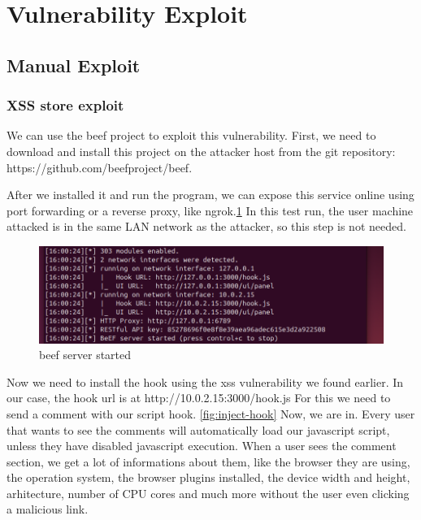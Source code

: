 \documentclass{article}
\begin{document}
\section{Vulnerability Exploit}
\label{}

\subsection{Manual Exploit}
\subsubsection{XSS store exploit}
\label{section:xss-store-exploit}
We can use the beef project to exploit this vulnerability. First, we need to download and install this project on the attacker host from the git repository: https://github.com/beefproject/beef.

After we installed it and run the program, we can expose this service online using port forwarding or a reverse proxy, like ngrok.\ref{fig:beef-server-started}
In this test run, the user machine attacked is in the same LAN network as the attacker, so this step is not needed.

\begin{figure}[H]
    \centering
    \includegraphics[width=1\linewidth]{Figures/beef/beef-server-started.png}
    \caption{\label{fig:beef-server-started}beef server started}
\end{figure}


Now we need to install the hook using the xss vulnerability we found earlier. In our case, the hook url is at http://10.0.2.15:3000/hook.js
For this we need to send a comment with our script hook. \ref{fig:inject-hook}
Now, we are in. Every user that wants to see the comments will automatically load our javascript script, unless they have disabled javascript execution.
When a user sees the comment section, we get a lot of informations about them, like the browser they are using, the operation system, the browser plugins installed, the device width and height, arhitecture, number of CPU cores and much more without the user even clicking a malicious link.
\end{document}
